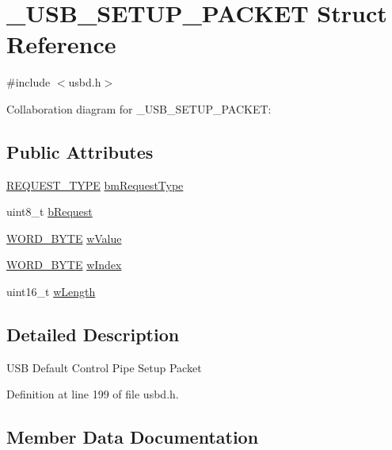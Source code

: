 \hypertarget{struct___u_s_b___s_e_t_u_p___p_a_c_k_e_t}{}\section{\+\_\+\+U\+S\+B\+\_\+\+S\+E\+T\+U\+P\+\_\+\+P\+A\+C\+K\+ET Struct Reference}
\label{struct___u_s_b___s_e_t_u_p___p_a_c_k_e_t}


{\ttfamily \#include $<$usbd.\+h$>$}



Collaboration diagram for \+\_\+\+U\+S\+B\+\_\+\+S\+E\+T\+U\+P\+\_\+\+P\+A\+C\+K\+ET\+:
\subsection*{Public Attributes}
\begin{DoxyCompactItemize}
\item 
\hyperlink{group___u_s_b_d___core_gac85164494feb72445fab7999a3723b6f}{R\+E\+Q\+U\+E\+S\+T\+\_\+\+T\+Y\+PE} \hyperlink{struct___u_s_b___s_e_t_u_p___p_a_c_k_e_t_ac3379b5aabd08a8d980fe8d030f5d6a8}{bm\+Request\+Type}
\item 
uint8\+\_\+t \hyperlink{struct___u_s_b___s_e_t_u_p___p_a_c_k_e_t_a95f462f8491a38e7ee662dcd95d5cb6a}{b\+Request}
\item 
\hyperlink{group___u_s_b_d___core_ga340ec8de2973608b96d5cc7379b9561a}{W\+O\+R\+D\+\_\+\+B\+Y\+TE} \hyperlink{struct___u_s_b___s_e_t_u_p___p_a_c_k_e_t_a790f014cc1dac6148a182b1cbe24bffe}{w\+Value}
\item 
\hyperlink{group___u_s_b_d___core_ga340ec8de2973608b96d5cc7379b9561a}{W\+O\+R\+D\+\_\+\+B\+Y\+TE} \hyperlink{struct___u_s_b___s_e_t_u_p___p_a_c_k_e_t_a1f0ec0c931efe4a96d92b3ceea80b2a3}{w\+Index}
\item 
uint16\+\_\+t \hyperlink{struct___u_s_b___s_e_t_u_p___p_a_c_k_e_t_a2beb83e5854b4a7bc518e5cfbc3f38a6}{w\+Length}
\end{DoxyCompactItemize}


\subsection{Detailed Description}
U\+SB Default Control Pipe Setup Packet 

Definition at line 199 of file usbd.\+h.



\subsection{Member Data Documentation}
\mbox{\label{struct___u_s_b___s_e_t_u_p___p_a_c_k_e_t_ac3379b5aabd08a8d980fe8d030f5d6a8}} 
